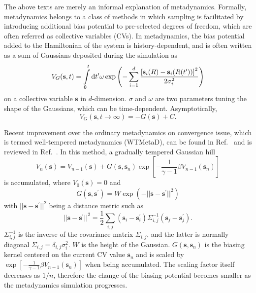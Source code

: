 
The above texts are merely an informal explanation of metadynamics. Formally, metadynamics belongs to a class of methods in which sampling is facilitated by introducing additional bias potential to pre-selected degrees of freedom, which are often referred as collective variables (CVs). In metadynamics, the bias potential added to the Hamiltonian of the system is history-dependent, and is often written as a sum of Gaussians deposited during the simulation as
\begin{equation}
   V_G(\mathbf{s},t) = \int\limits_0^t\mathop{}\!\mathrm{d} t^\prime \omega\exp{\left(-\sum\limits_{i=1}^{d}\frac{\left[\mathbf{s}_i(R)-\mathbf{s}_i(R(t^\prime))\right]^2}{2\sigma_i^2}\right)}
\end{equation}
on a collective variable $\mathbf{s}$ in $d$-dimension. $\sigma$ and $\omega$ are two parameters tuning the shape of the Gaussians, which can be time-dependent. Asymptotically, 
\begin{equation}
   V_G(\mathbf{s},t\rightarrow \infty) = -G(\mathbf{s})+C.
\end{equation}

Recent improvement over the ordinary metadynamics on convergence issue, which is termed well-tempered metadynamics (WTMetaD), can be found in Ref.~\cite{BarducciPRL2008} and is reviewed in Ref.~\cite{ValssonARPC2016}. In this method, a gradually tempered Gaussian hill
\begin{equation}
    V_n(\mathbf{s})=V_{n-1}(\mathbf{s})+G(\mathbf{s},\mathbf{s}_n)\exp{\left[-\frac{1}{\gamma-1}\beta V_{n-1}(\mathbf{s}_n)\right]}
\end{equation}
is accumulated, where $V_0(\mathbf{s})=0$ and
\begin{equation}
    G(\mathbf{s},\mathbf{s}^\prime)=W\exp{\left(-||\mathbf{s}-\mathbf{s}^\prime||^2\right)}
\end{equation}
with $||\mathbf{s}-\mathbf{s}^\prime||^2$ being a distance metric such as
\begin{equation}
    ||\mathbf{s}-\mathbf{s}^\prime||^2=\frac{1}{2}\sum_{i,j}{(\mathbf{s}_i-\mathbf{s}_i^\prime)\Sigma_{i,j}^{-1}(\mathbf{s}_j-\mathbf{s}_j^\prime)}.
\end{equation}
$\Sigma_{i,j}^{-1}$ is the inverse of the covariance matrix $\Sigma_{i,j}$, and the latter is normally diagonal $\Sigma_{i,j}=\delta_{i,j}\sigma_i^2$. $W$ is the height of the Gaussian. $G(\mathbf{s},\mathbf{s}_n)$ is the biasing kernel centered on the current CV value $\mathbf{s}_n$ and is scaled by $\exp{\left[-\frac{1}{\gamma-1}\beta V_{n-1}(\mathbf{s}_n)\right]}$ when being accumulated. The scaling factor itself decreases as $1/n$, therefore the change of the biasing potential becomes smaller as the metadynamics simulation progresses.\cite{DamaPRL2014}


